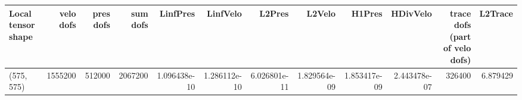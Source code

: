 \begin{tabular}{lrrrrrrrrrrr}
\toprule
Local tensor shape &  velo dofs &  pres dofs &  sum dofs &     LinfPres &     LinfVelo &       L2Pres &       L2Velo &       H1Pres &     HDivVelo &  trace dofs (part of velo dofs) &  L2Trace \\
\midrule
        (575, 575) &    1555200 &     512000 &   2067200 & 1.096438e-10 & 1.286112e-10 & 6.026801e-11 & 1.829564e-09 & 1.853417e-09 & 2.443478e-07 &                          326400 & 6.879429 \\
\bottomrule
\end{tabular}
